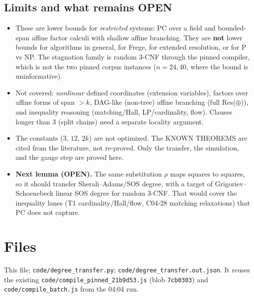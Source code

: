 \documentclass[11pt]{article}
\theoremstyle{definition}
\begin{document}
\subsection*{Limits and what remains OPEN}
\begin{itemize}
\item These are lower bounds for \emph{restricted} systems: PC over a field and bounded-span affine factor calculi with shallow affine branching. They are \textbf{not} lower bounds for algorithms in general, for Frege, for extended resolution, or for P vs NP. The stagnation family is random 3-CNF through the pinned compiler, which is not the two pinned corpus instances ($n=24,40$, where the bound is uninformative).
\item Not covered: \emph{nonlinear} defined coordinates (extension variables), factors over affine forms of span $>k$, DAG-like (non-tree) affine branching (full Res($\oplus$)), and inequality reasoning (matching/Hall, LP/cardinality, flow). Clauses longer than 3 (split chains) need a separate locality argument.
\item The constants ($3$, $12$, $2k$) are not optimized. The KNOWN THEOREMS are cited from the literature, not re-proved. Only the transfer, the simulation, and the gauge step are proved here.
\item \textbf{Next lemma (OPEN).} The same substitution $\rho$ maps squares to squares, so it should transfer Sherali--Adams/SOS degree, with a target of Grigoriev--Schoenebeck linear SOS degree for random 3-CNF. That would cover the inequality lanes (T1 cardinality/Hall/flow, C04-28 matching relaxations) that PC does not capture.
\end{itemize}

\section*{Files}
This file; \texttt{code/degree\_transfer.py}; \texttt{code/degree\_transfer.out.json}. It reuses the existing \texttt{code/compile\_pinned\_21b9d53.js} (blob \texttt{7cb0303}) and \texttt{code/compile\_batch.js} from the 04:04 run.
\end{document}
